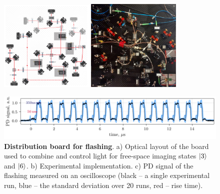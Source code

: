 \begin{figure}[h]
    \centering
     \phantom{4}
    \includegraphics[width=0.4\textwidth]{fig-ai/flashing-distribution-scheme.pdf}
    \hspace{10 mm} 
     \phantom{4}
    \includegraphics[width=0.4\textwidth]{imgs/flashing-distribution-img.jpg}

    \includegraphics{fig-py/flashing-oscilloscope.pdf}

    \caption{
        \textbf{Distribution board for flashing}. 
        a) Optical layout of the board used to combine and control light for free-space imaging states $\left| 3 \right\rangle$ and $\left| 6 \right\rangle$.
        b) Experimental implementation.
        c) PD signal of the flashing measured on an oscilloscope (black -- a single experimental run, blue -- the standard deviation over 20 runs, red -- rise time).
    }
    \label{fig:flashing}
\end{figure}


